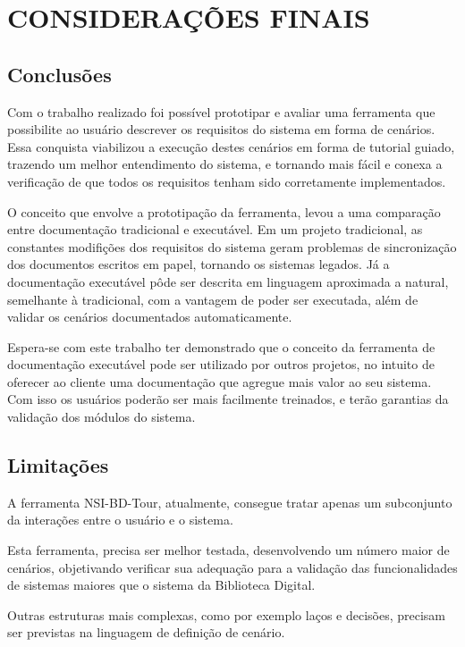 \chapter{CONSIDERAÇÕES FINAIS}

\section{Conclusões}

Com o trabalho realizado foi possível prototipar e avaliar uma ferramenta que possibilite ao usuário descrever os requisitos do sistema em forma de cenários. Essa conquista viabilizou a execução destes cenários em forma de tutorial guiado, trazendo um melhor entendimento do sistema, e tornando mais fácil e conexa a verificação de que todos os requisitos tenham sido corretamente implementados.

O conceito que envolve a prototipação da ferramenta, levou a uma comparação entre documentação tradicional e executável. Em um projeto tradicional, as constantes modifições dos requisitos do sistema geram problemas de sincronização dos documentos escritos em papel, tornando os sistemas legados. Já a documentação executável pôde ser descrita em linguagem aproximada a natural, semelhante à tradicional, com a vantagem de poder ser executada, além de validar os cenários documentados automaticamente.

Espera-se com este trabalho ter demonstrado que o conceito da ferramenta de documentação executável pode ser utilizado por outros projetos, no intuito de oferecer ao cliente uma documentação que agregue mais valor ao seu sistema. Com isso os usuários poderão ser mais facilmente treinados, e terão garantias da validação dos módulos do sistema.

\section{Limitações}

A ferramenta NSI-BD-Tour, atualmente, consegue tratar apenas um subconjunto da interações entre o usuário e o sistema.

Esta ferramenta, precisa ser melhor testada, desenvolvendo um número maior de cenários, objetivando verificar sua adequação para a validação das funcionalidades de sistemas maiores que o sistema da Biblioteca Digital.

Outras estruturas mais complexas, como por exemplo laços e decisões, precisam ser previstas na linguagem de definição de cenário.

